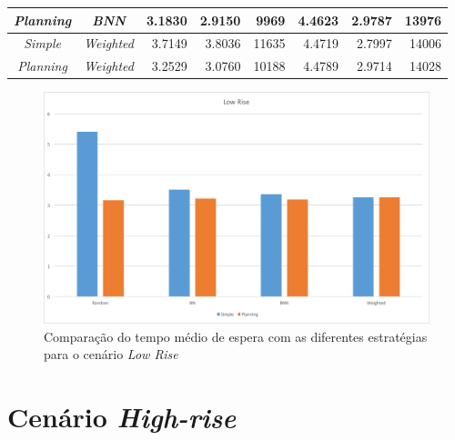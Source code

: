 \begin{table}[htb!]
\begin{tabular}{|c|c|r|r|r|r|r|r|}
\textit{Planning}    & \textit{BNN}             & 3.1830                              & 2.9150                               & 9969                                & \cellcolor[HTML]{67FD9A}4.4623                        & \cellcolor[HTML]{FFFFFF}2.9787                        & \cellcolor[HTML]{67FD9A}13976                        \\ \hline
\textit{Simple}      & \textit{Weighted}        & 3.7149                              & 3.8036                               & 11635                               & 4.4719                                                & \cellcolor[HTML]{67FD9A}2.7997                        & 14006                                                \\ \hline
\textit{Planning}    & \textit{Weighted}        & 3.2529                              & 3.0760                               & 10188                               & 4.4789                                                & 2.9714                                                & 14028                                                \\ \hline
\end{tabular}
\end{table}

\begin{figure}[htb]
  \centering
  \includegraphics[scale=0.5]{img/chart-averages-low-rise}
  \caption{Comparação do tempo médio de espera com as diferentes estratégias
    para o cenário \textit{Low Rise}}
  \label{fig:result:average:low-rise}
\end{figure}

\section{Cenário \textit{High-rise}}

